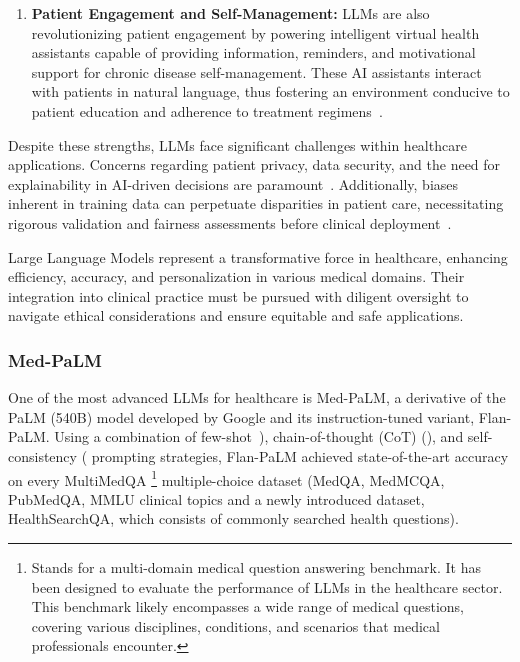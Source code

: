 \begin{enumerate}
	\item \textbf{Patient Engagement and Self-Management:}{
		      LLMs are also revolutionizing patient engagement by powering intelligent virtual health assistants capable of providing information, reminders, and motivational support for chronic disease self-management. These AI assistants interact with patients in natural language, thus fostering an environment conducive to patient education and adherence to treatment regimens~\cite{kocaballi2019personalization}.
	      }
\end{enumerate}

Despite these strengths, LLMs face significant challenges within healthcare applications.
Concerns regarding patient privacy, data security, and the need for explainability in AI-driven decisions are paramount~\cite{beam2018big}.
Additionally, biases inherent in training data can perpetuate disparities in patient care, necessitating rigorous validation and fairness assessments before clinical deployment~\cite{chen2019single}.

Large Language Models represent a transformative force in healthcare, enhancing efficiency, accuracy, and personalization in various medical domains.
Their integration into clinical practice must be pursued with diligent oversight to navigate ethical considerations and ensure equitable and safe applications.

\subsubsection{Med-PaLM}
\label{subsubsec:med-palm}

One of the most advanced LLMs for healthcare is Med-PaLM, a derivative of the PaLM (540B) model developed by Google and its instruction-tuned variant, Flan-PaLM. Using a combination of few-shot~\cite{brown2020language}), chain-of-thought (CoT) (\textcite{wei2022chain}), and self-consistency (\textcite{wang2022self} prompting strategies, Flan-PaLM achieved state-of-the-art accuracy on every MultiMedQA \footnote{Stands for a multi-domain medical question answering benchmark. It has been designed to evaluate the performance of LLMs in the healthcare sector.
	This benchmark likely encompasses a wide range of medical questions, covering various disciplines, conditions, and scenarios that medical professionals encounter.} multiple-choice dataset (MedQA, MedMCQA, PubMedQA, MMLU clinical topics and a newly introduced dataset, HealthSearchQA, which consists of commonly searched health questions).

